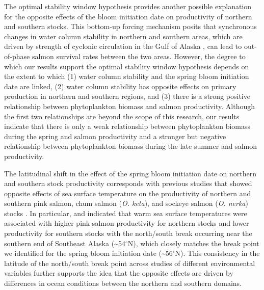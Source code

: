 The optimal stability window hypothesis \citep{Cury1989a, Gargett1997a} provides
another possible explanation for the opposite effects of the bloom initiation
date on productivity of northern and southern stocks.  This bottom-up forcing
mechanism posits that synchronous changes in water column stability in northern
and southern areas, which are driven by strength of cyclonic circulation in the
Gulf of Alaska \citep{Gargett1997a}, can lead to out-of-phase salmon survival
rates between the two areas. However, the degree to which our results support
the optimal stability window hypothesis depends on the extent to which (1) water
column stability and the spring bloom initiation date are linked, (2) water
column stability has opposite effects on primary production in northern and
southern regions, and (3) there is a strong positive relationship between
phytoplankton biomass and salmon productivity. Although the first two
relationships are beyond the scope of this research, our results indicate that
there is only a weak relationship between phytoplankton biomass during the
spring and salmon productivity and a stronger but negative relationship between
phytoplankton biomass during the late summer and salmon productivity.

The latitudinal shift in the effect of the spring bloom initiation date on
northern and southern stock productivity corresponds with previous studies that
showed opposite effects of sea surface temperature on the productivity of
northern and southern pink salmon, chum salmon (\emph{O.  keta}), and sockeye
salmon (\emph{O. nerka}) stocks \citep{Mueter2002a, Su2004a}. In particular,
\citet{Mueter2002a} and \citet{Su2004a} indicated that warm sea surface
temperatures were associated with higher pink salmon productivity for northern
stocks and lower productivity for southern stocks with the north/south break
occurring near the southern end of Southeast Alaska
(\textasciitilde{}54$^{\circ}$N), which closely matches the break point we
identified for the spring bloom initiation date
(\textasciitilde{}56$^{\circ}$N).  This consistency in the latitude of the
north/south break point across studies of different environmental variables
further supports the idea that the opposite effects are driven by differences in
ocean conditions between the northern and southern domains.

